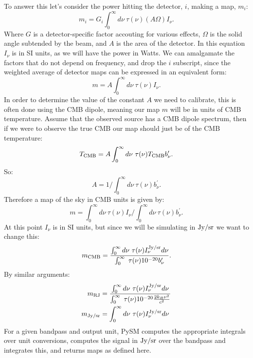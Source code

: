 \documentclass[12pt]{article}
\begin{document}
To answer this let's consider the power hitting the detector, $i$, making a map, $m_i$:
\[
m_i = G_i \int^\infty_0 d\nu \ \tau(\nu) (A \Omega) I_\nu.
\]
Where $G$ is a detector-specific factor accouting for various effects, $\Omega$ is the solid
angle subtended by the beam, and $A$ is the area of the detector. In this equation $I_\nu$ is
in SI units, as we will have the power in Watts. We can amalgamate the factors that do not
depend on frequency, and drop the $i$ subscript, since the weighted average
of detector maps can be expressed in an equivalent form:
\[
m = A \int^\infty_0 d\nu \ \tau(\nu) I_\nu.
\]
In order to determine the value of the constant $A$ we need to calibrate, this is often
done using the CMB dipole, meaning our map $m$ will be in units of CMB temperature. Assume
that the observed source has a CMB dipole spectrum, then if we were to observe the true
CMB our map should just be of the CMB temperature:
\[
T_{\rm CMB} =  A \int^\infty_0 d\nu \ \tau(\nu) T_{\rm CMB} b^\prime_\nu.
\]
So:
\[
A = 1 / \int^\infty_0 d\nu \ \tau(\nu) b^\prime_\nu.
\]
Therefore a map of the sky in CMB units is given by:
\[
m = \int^\infty_0 d\nu \ \tau(\nu) I_\nu / \int^\infty_0  d\nu \ \tau(\nu) b^\prime_\nu .
\]
At this point $I_\nu$ is in SI units, but since we will be simulating in ${\rm Jy/sr}$ we want
to change this:
\[
m_{\rm CMB} =\frac{ \int^\infty_0 d\nu \ \tau(\nu) I^{\rm Jy/sr}_\nu d\nu}{ \int^\infty_0 \ \tau(\nu) 10^{-20} b^\prime_\nu}.
\]
By similar arguments:
\[
\begin{aligned}
  m_{\rm RJ} &=\frac{ \int^\infty_0 d\nu \ \tau(\nu) I^{\rm Jy/sr}_\nu d\nu}{ \int^\infty_0 \ \tau(\nu) 10^{-20} \frac{2 k_B \nu^2}{c^2}} \\
  m_{\rm Jy/sr} &= \int^\infty_0 d\nu \ \tau(\nu) I^{\rm Jy/sr}_\nu d\nu
\end{aligned}
\]
For a given bandpass and output unit, PySM computes the appropriate integrals over unit conversions,
computes the signal in ${\rm Jy/sr}$ over the bandpass and integrates this, and returns maps as defined
here.
\end{document}
